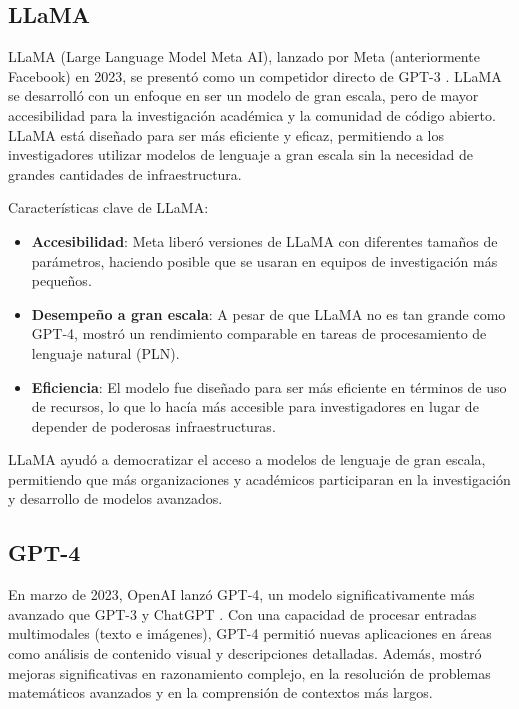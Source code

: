 \subsection{LLaMA}
LLaMA (Large Language Model Meta AI), lanzado por Meta (anteriormente Facebook) en 2023, se presentó como un competidor directo de GPT-3 \cite{touvron2023llamaopenefficientfoundation}. 
LLaMA se desarrolló con un enfoque en ser un modelo de gran escala, pero de mayor accesibilidad para la investigación académica y la comunidad de código abierto. 
LLaMA está diseñado para ser más eficiente y eficaz, permitiendo a los investigadores utilizar modelos de lenguaje a gran escala sin la necesidad de grandes cantidades de infraestructura.

Características clave de LLaMA:
\begin{itemize}
    \item \textbf{Accesibilidad}: Meta liberó versiones de LLaMA con diferentes tamaños de parámetros, haciendo posible que se usaran en equipos de investigación más pequeños.
    \item \textbf{Desempeño a gran escala}: A pesar de que LLaMA no es tan grande como GPT-4, mostró un rendimiento comparable en tareas de procesamiento de lenguaje natural (PLN).
    \item \textbf{Eficiencia}: El modelo fue diseñado para ser más eficiente en términos de uso de recursos, lo que lo hacía más accesible para investigadores en lugar de depender de poderosas infraestructuras.
\end{itemize}

LLaMA ayudó a democratizar el acceso a modelos de lenguaje de gran escala, permitiendo que más organizaciones y académicos participaran en la investigación y desarrollo de modelos avanzados.


\subsection{GPT-4}

En marzo de 2023, OpenAI lanzó GPT-4, un modelo significativamente más avanzado que GPT-3 y ChatGPT \cite{openai2024gpt4technicalreport}. 
Con una capacidad de procesar entradas multimodales (texto e imágenes), GPT-4 permitió nuevas aplicaciones en áreas como análisis de contenido visual y descripciones detalladas. 
Además, mostró mejoras significativas en razonamiento complejo, en la resolución de problemas matemáticos avanzados y en la comprensión de contextos más largos.

